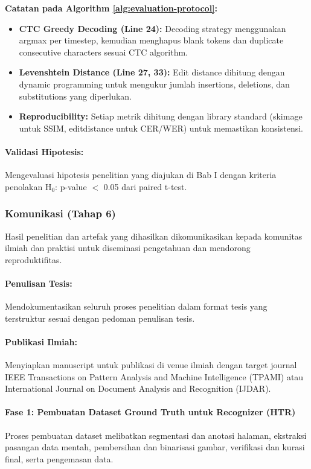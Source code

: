 \documentclass[12pt,a4paper]{article}
\begin{document}
\textbf{Catatan pada Algorithm \ref{alg:evaluation-protocol}:}
\begin{itemize}[nosep]
    \item \textbf{CTC Greedy Decoding (Line 24):} Decoding strategy menggunakan argmax per timestep, kemudian menghapus blank tokens dan duplicate consecutive characters sesuai CTC algorithm.
    \item \textbf{Levenshtein Distance (Line 27, 33):} Edit distance dihitung dengan dynamic programming untuk mengukur jumlah insertions, deletions, dan substitutions yang diperlukan.
    \item \textbf{Reproducibility:} Setiap metrik dihitung dengan library standard (skimage untuk SSIM, editdistance untuk CER/WER) untuk memastikan konsistensi.
\end{itemize}

\paragraph{Validasi Hipotesis:}
Mengevaluasi hipotesis penelitian yang diajukan di Bab I dengan kriteria penolakan H$_0$: p-value $<$ 0.05 dari paired t-test.

\subsubsection{Komunikasi (Tahap 6)}
Hasil penelitian dan artefak yang dihasilkan dikomunikasikan kepada komunitas ilmiah dan praktisi untuk diseminasi pengetahuan dan mendorong reproduktifitas.

\paragraph{Penulisan Tesis:}
Mendokumentasikan seluruh proses penelitian dalam format tesis yang terstruktur sesuai dengan pedoman penulisan tesis.

\paragraph{Publikasi Ilmiah:}
Menyiapkan manuscript untuk publikasi di venue ilmiah dengan target journal IEEE Transactions on Pattern Analysis and Machine Intelligence (TPAMI) atau International Journal on Document Analysis and Recognition (IJDAR).



\paragraph{Fase 1: Pembuatan Dataset Ground Truth untuk Recognizer (HTR)}
Proses pembuatan dataset melibatkan segmentasi dan anotasi halaman, ekstraksi pasangan data mentah, pembersihan dan binarisasi gambar, verifikasi dan kurasi final, serta pengemasan data.
\end{document}
